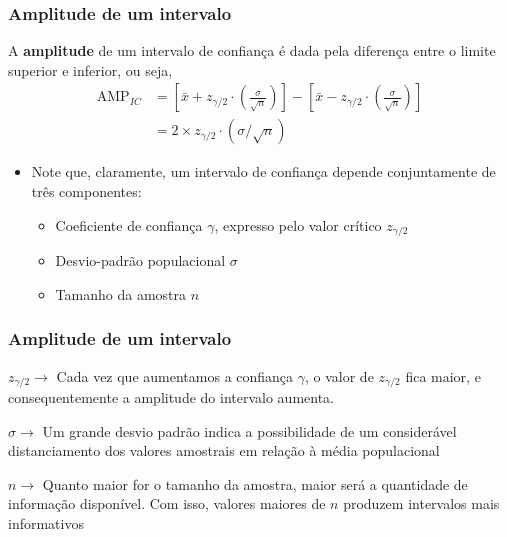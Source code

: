 \documentclass[11pt]{beamer}
\begin{document}
\begin{frame}
\frametitle{Amplitude de um intervalo}

A \textbf{amplitude} de um intervalo de confiança é dada pela diferença
entre o limite superior e inferior, ou seja, \begin{align*}
\text{AMP}_{IC} &=
  \left[ \bar{x} + z_{\gamma/2} \cdot
  \left( \frac{\sigma}{\sqrt{n}} \right) \right] -
  \left[ \bar{x} - z_{\gamma/2} \cdot
  \left( \frac{\sigma}{\sqrt{n}} \right) \right] \\
 &= 2 \times z_{\gamma/2} \cdot (\sigma/\sqrt{n})
\end{align*}

\begin{itemize}
\item
  Note que, claramente, um intervalo de confiança depende conjuntamente
  de três componentes:

  \begin{itemize}
  \item
    Coeficiente de confiança \(\gamma\), expresso pelo valor crítico
    \(z_{\gamma/2}\)
  \item
    Desvio-padrão populacional \(\sigma\)
  \item
    Tamanho da amostra \(n\)
  \end{itemize}
\end{itemize}
\end{frame}

\begin{frame}
\frametitle{Amplitude de um intervalo}

\(z_{\gamma/2} \rightarrow\) Cada vez que aumentamos a confiança
\(\gamma\), o valor de \(z_{\gamma/2}\) fica maior, e consequentemente a
amplitude do intervalo aumenta.

\(\sigma \rightarrow\) Um grande desvio padrão indica a possibilidade de
um considerável distanciamento dos valores amostrais em relação à média
populacional

\(n \rightarrow\) Quanto maior for o tamanho da amostra, maior será a
quantidade de informação disponível. Com isso, valores maiores de \(n\)
produzem intervalos mais informativos
\end{frame}
\end{document}
